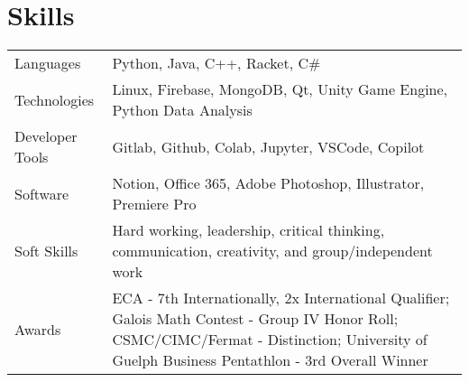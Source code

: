 \documentclass[letterpaper,11pt]{article}
\begin{document}
\section{Skills}

\begin{tabularx}{\linewidth}{@{}l@{\hspace{0.5em}}X@{}}
Languages &  \normalsize{Python, Java, C++, Racket, C\#}\\
Technologies  &  \normalsize{Linux,  Firebase, MongoDB, Qt, Unity Game Engine, Python Data Analysis}\\ 
Developer Tools &  \normalsize{Gitlab,  Github, Colab, Jupyter, VSCode, Copilot}\\
Software  &  \normalsize{Notion, Office 365, Adobe Photoshop, Illustrator, Premiere Pro}\\ 
Soft Skills &  \normalsize{Hard working, leadership, critical thinking, communication, creativity, and group/independent work}\\
Awards & \normalsize{ECA - 7th Internationally, 2x International Qualifier; Galois Math Contest - Group IV Honor Roll; CSMC/CIMC/Fermat - Distinction; University of Guelph Business Pentathlon - 3rd Overall Winner}\\
\end{tabularx}

\vfill
{}
\end{document}
